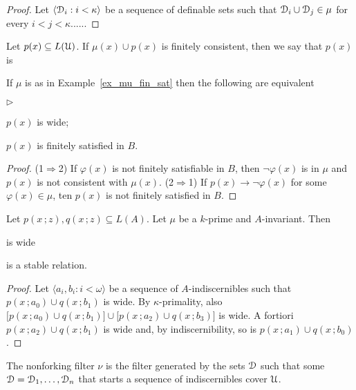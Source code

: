 \documentclass{amsproc}
\newcommand{\mylabel}[1]{{#1}\hfill}
\renewenvironment{itemize}
  {\begin{list}{$\triangleright$}{%
  \setlength{\parskip}{0mm}
  \setlength{\topsep}{.4\baselineskip}
  \setlength{\rightmargin}{0mm}
  \setlength{\listparindent}{0mm}
  \setlength{\itemindent}{0mm}
  \setlength{\labelwidth}{3ex}
  \setlength{\itemsep}{.2\baselineskip}
  \setlength{\parsep}{.2\baselineskip}
  \setlength{\partopsep}{0mm}
  \setlength{\labelsep}{1ex}
  \setlength{\leftmargin}{\labelwidth+\labelsep}
  \let\makelabel\mylabel}}{%
\end{list}}
\renewcommand*{\emph}[1]{%
   \smash{\tikz[baseline]\node[rectangle, fill=teal!25, rounded corners, inner xsep=0.5ex, inner ysep=0.2ex, anchor=base, minimum height = 2.7ex]{\strut #1};}}
\begin{document}
\begin{proof}
  Let $\langle\EuScript D_i:i<\kappa\rangle$ be a sequence of definable sets such that $\EuScript D_i\cup \EuScript D_j\in\mu$ for every $i<j<\kappa$......
\end{proof}

\begin{definition}
  Let $p(x)\subseteq L(\EuScript U)$.
  If $\mu(x)\cup p(x)$ is finitely consistent, then we say that $p(x)$ is \emph{wide.}
\end{definition}

\begin{example}
  If $\mu$ is as in Example~\ref{ex_mu_fin_sat} then the following are equivalent
  \begin{itemize}
    \item[1.] $p(x)$ is wide;
    \item[2.] $p(x)$ is finitely satisfied in $B$.
  \end{itemize}
\end{example}

\begin{proof}
  (1$\Rightarrow$2) If $\varphi(x)$ is not finitely satisfiable in $B$, then $\neg\varphi(x)$ is in $\mu$ and $p(x)$ is not consistent with $\mu(x)$.
  (2$\Rightarrow$1) If $p(x)\rightarrow\neg\varphi(x)$ for some $\varphi(x)\in\mu$, ten $p(x)$ is not finitely satisfied in $B$.
\end{proof}

\begin{theorem}
  Let $p(x\,;z), q(x\,;z)\subseteq L(A)$.
  Let $\mu$ be a $k$-prime and $A$-invariant.
  Then 

   is wide

  is a stable relation.
\end{theorem}

\begin{proof}
  Let $\langle a_i,b_i: i<\omega\rangle$ be a sequence of $A$-indiscernibles such that $p(x\,;a_0)\cup q(x\,;b_1)$ is wide.
  By $\kappa$-primality, also $\big[p(x\,;a_0)\cup q(x\,;b_1)\big]\cup\big[p(x\,;a_2)\cup q(x\,;b_3)\big]$ is wide.
  A fortiori $p(x\,;a_2)\cup q(x\,;b_1)$ is wide and, by indiscernibility, so is $p(x\,;a_1)\cup q(x\,;b_0)$.
\end{proof}

\begin{definition}
  The nonforking filter $\nu$ is the filter generated by the sets $\EuScript D$ such that some $\EuScript D=\EuScript D_1,\dots,\EuScript D_n$ that starts a sequence of indiscernibles cover $\EuScript U$.
\end{definition}
\end{document}
